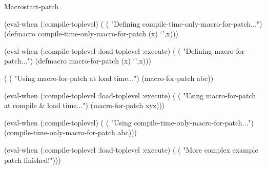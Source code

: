 \documentclass[10pt,twoside,english,pdftex]{article}
\begin{document}
\begin{functiondoc}{Macro}{start-patch}
\begin{example}
  (eval-when (:compile-toplevel)
    (
     ( "Defining compile-time-only-macro-for-patch...")
     (defmacro compile-time-only-macro-for-patch (x)
       `',x)))

  (eval-when (:compile-toplevel :load-toplevel :execute)
    (
     ( "Defining macro-for-patch...")
     (defmacro macro-for-patch (x)
       `',x)))\goodpagebreak

  (
   ( "Using macro-for-patch at load time...")
   (macro-for-patch abc))

  (eval-when (:compile-toplevel :load-toplevel :execute)
    (
     ( "Using macro-for-patch at compile & load time...")
     (macro-for-patch xyz)))\goodpagebreak

  (eval-when (:compile-toplevel)
    (
     ( "Using compile-time-only-macro-for-patch...")
     (compile-time-only-macro-for-patch abc)))

  (eval-when (:compile-toplevel :load-toplevel :execute)
    (
     ( "More complex example patch finished!")))
\end{example}

\end{functiondoc}

\end{document}
